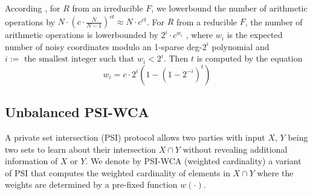 According \cite{cryptoeprint:2022/1035}, for $R$ from an irreducible $F$, we lowerbound the number of arithmetic operations by $N\cdot (c\cdot \frac{N}{N-1})^{ct}\approx N\cdot c^{ct}$.  For $R$ from a reducible $F$, the number of arithmetic operations is lowerbounded by $2^i\cdot c^{w_i}$ , where $w_i$ is the expected number of noisy coordinates modulo an 1-sparse deg-$2^i$ polynomial and $i:=\text{ the smallest integer such that }w_i<2^i$. Then $t$ is computed by the equation 
\[w_i = c\cdot 2^i\left(1-(1-2^{-i})^t\right)\]




\subsection{Unbalanced PSI-WCA}
A private set intersection (PSI) protocol allows two parties with input $X$, $Y$ being two sets to learn about their intersection $X\cap Y$ without revealing additional information of $X$ or $Y$. We denote by PSI-WCA (weighted cardinality) a variant of PSI that computes the weighted cardinality of elements in $X\cap Y$ where the weights are determined by a pre-fixed function $w(\cdot)$. 

